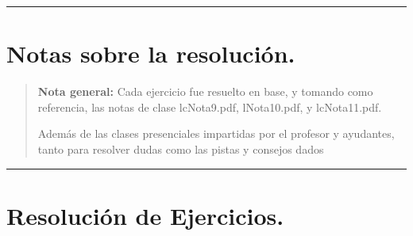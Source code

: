 \documentclass[12pt,letterpaper]{article}
\begin{document}
\bigskip
\hrule height 0.1pt
\bigskip

\section*{Notas sobre la resolución.}

\begin{quote}
  \textbf{Nota general:} Cada ejercicio fue resuelto en base, y tomando como referencia, las notas de clase lcNota9.pdf, lNota10.pdf, y lcNota11.pdf.
  
  Adem\'{a}s de las clases presenciales impartidas por el profesor y ayudantes, tanto para resolver dudas como las pistas y consejos dados
\end{quote}

\bigskip
\hrule height 0.1pt
\bigskip

\newpage
\section*{Resolución de Ejercicios.}
\end{document}
